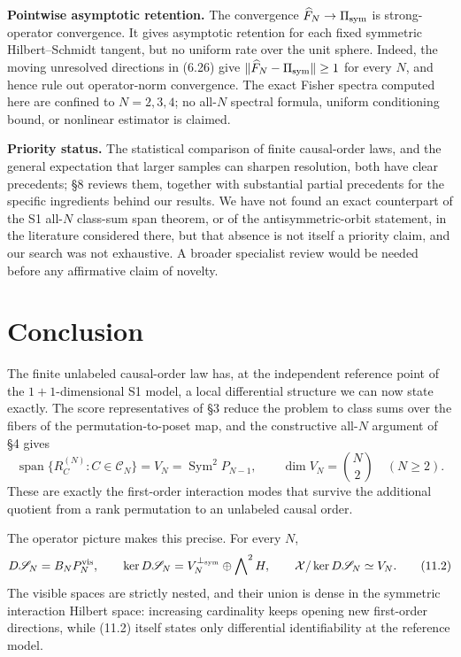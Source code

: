 \documentclass[11pt]{article}
\begin{document}
\textbf{Pointwise asymptotic retention.} The convergence \(\widehat F_N\to\Pi_{\rm sym}\) is strong-operator convergence. It gives asymptotic retention for each fixed symmetric Hilbert--Schmidt tangent, but no uniform rate over the unit sphere. Indeed, the moving unresolved directions in (6.26) give \(\|\widehat F_N-\Pi_{\rm sym}\|\ge1\) for every \(N\), and hence rule out operator-norm convergence. The exact Fisher spectra computed here are confined to \(N=2,3,4\); no all-\(N\) spectral formula, uniform conditioning bound, or nonlinear estimator is claimed.

\textbf{Priority status.} The statistical comparison of finite causal-order laws, and the general expectation that larger samples can sharpen resolution, both have clear precedents; \S8 reviews them, together with substantial partial precedents for the specific ingredients behind our results. We have not found an exact counterpart of the S1 all-\(N\) class-sum span theorem, or of the antisymmetric-orbit statement, in the literature considered there, but that absence is not itself a priority claim, and our search was not exhaustive. A broader specialist review would be needed before any affirmative claim of novelty.

\section{Conclusion}

The finite unlabeled causal-order law has, at the independent reference point of the \(1+1\)-dimensional S1 model, a local differential structure we can now state exactly. The score representatives of \S3 reduce the problem to class sums over the fibers of the permutation-to-poset map, and the constructive all-\(N\) argument of \S4 gives \[ \operatorname{span}\{R_C^{(N)}:C\in\mathcal C_N\} =V_N=\operatorname{Sym}^2P_{N-1}, \qquad \dim V_N=\binom N2 \quad(N\ge2). \tag{11.1} \] These are exactly the first-order interaction modes that survive the additional quotient from a rank permutation to an unlabeled causal order.

The operator picture makes this precise. For every \(N\), \[ D\mathscr S_N=B_NP_N^{\rm vis}, \qquad \ker D\mathscr S_N =V_N^{\perp_{\rm sym}}\oplus\bigwedge\nolimits^2H, \qquad \mathcal X/\ker D\mathscr S_N\simeq V_N. \tag{11.2} \] The visible spaces are strictly nested, and their union is dense in the symmetric interaction Hilbert space: increasing cardinality keeps opening new first-order directions, while (11.2) itself states only differential identifiability at the reference model.
\end{document}
